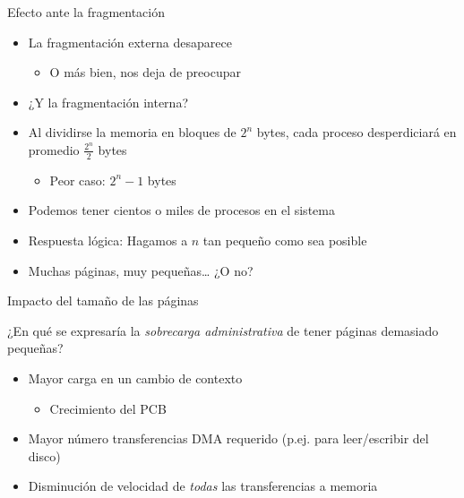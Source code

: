 \documentclass[presentation]{beamer}
\begin{document}
\begin{frame}[label={sec:org95c473b}]{Efecto ante la fragmentación}
\begin{itemize}
\item La fragmentación externa desaparece
\begin{itemize}
\item O más bien, nos deja de preocupar
\end{itemize}
\item ¿Y la fragmentación interna?
\end{itemize}
\pause
\begin{itemize}
\item Al dividirse la memoria en bloques de \(2^n\) bytes, cada proceso
desperdiciará en promedio \(\frac{2^n}{2}\) bytes
\begin{itemize}
\item Peor caso: \(2^n-1\) bytes
\end{itemize}
\item Podemos tener cientos o miles de procesos en el sistema
\end{itemize}
\pause
\begin{itemize}
\item Respuesta lógica: Hagamos a \(n\) tan pequeño como sea posible
\item Muchas páginas, muy pequeñas\ldots{} \pause ¿O no?
\end{itemize}
\end{frame}

\begin{frame}[label={sec:org8078af7}]{Impacto del tamaño de las páginas}
\begin{center}
¿En qué se expresaría la \emph{sobrecarga administrativa} de tener páginas
demasiado pequeñas?
\end{center}
\begin{itemize}
\item Mayor carga en un cambio de contexto
\begin{itemize}
\item Crecimiento del PCB
\end{itemize}
\item Mayor número transferencias DMA requerido (p.ej. para leer/escribir
del disco)
\item Disminución de velocidad de \emph{todas} las transferencias a memoria
\end{itemize}
\end{frame}
\end{document}

